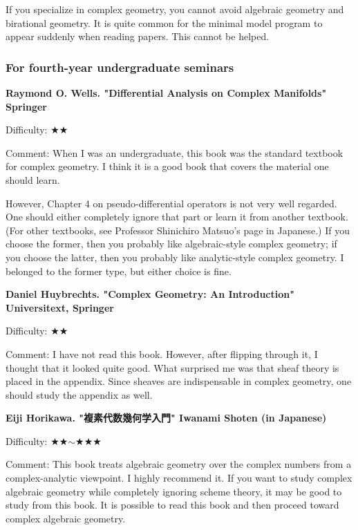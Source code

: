 If you specialize in complex geometry, you cannot avoid algebraic geometry and birational geometry. It is quite common for the minimal model program to appear suddenly when reading papers. This cannot be helped.

\subsubsection{For fourth-year undergraduate seminars}

\textbf{Raymond O. Wells. "Differential Analysis on Complex Manifolds" Springer}  \vspace{-6pt}

Difficulty: ★★　\vspace{-6pt}

Comment: When I was an undergraduate, this book was the standard textbook for complex geometry. I think it is a good book that covers the material one should learn.

However, Chapter 4 on pseudo-differential operators is not very well regarded. One should either completely ignore that part or learn it from another textbook. (For other textbooks, see Professor Shinichiro Matsuo's page in Japanese.) If you choose the former, then you probably like algebraic-style complex geometry; if you choose the latter, then you probably like analytic-style complex geometry. I belonged to the former type, but either choice is fine.
\vspace{8pt}

\textbf{Daniel Huybrechts. "Complex Geometry: An Introduction" Universitext, Springer} \vspace{-6pt}
 
Difficulty: ★★ \vspace{-6pt}

Comment: I have not read this book. However, after flipping through it, I thought that it looked quite good. What surprised me was that sheaf theory is placed in the appendix. Since sheaves are indispensable in complex geometry, one should study the appendix as well.
\vspace{8pt}

\textbf{Eiji Horikawa. "複素代数幾何学入門" Iwanami Shoten (in Japanese)}

Difficulty: ★★$\sim$★★★ \vspace{-6pt} 

Comment: This book treats algebraic geometry over the complex numbers from a complex-analytic viewpoint. I highly recommend it. If you want to study complex algebraic geometry while completely ignoring scheme theory, it may be good to study from this book. It is possible to read this book and then proceed toward complex algebraic geometry.

